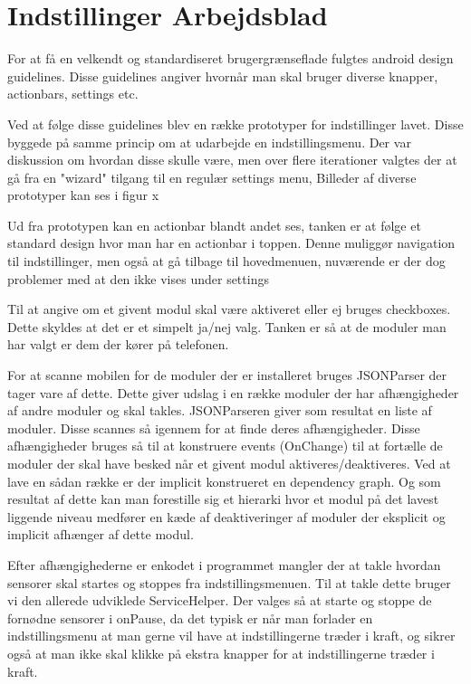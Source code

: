 \chapter{Indstillinger Arbejdsblad}
For at få en velkendt og standardiseret brugergrænseflade fulgtes android design guidelines.
Disse guidelines angiver hvornår man skal bruger diverse knapper, actionbars, settings etc.


Ved at følge disse guidelines blev en række prototyper for indstillinger lavet.
Disse byggede på samme princip om at udarbejde en indstillingsmenu.
Der var diskussion om hvordan disse skulle være, men over flere iterationer valgtes der at gå fra en "wizard" tilgang til en regulær settings menu,
Billeder af diverse prototyper kan ses i figur x 

Ud fra prototypen kan en actionbar blandt andet ses, tanken er at følge et standard design hvor man har en actionbar i toppen.
Denne muliggør navigation til indstillinger, men også at gå tilbage til hovedmenuen, nuværende er der dog problemer med at den ikke vises under settings

Til at angive om et givent modul skal være aktiveret eller ej bruges checkboxes.
Dette skyldes at det er et simpelt ja/nej valg. 
Tanken er så at de moduler man har valgt er dem der kører på telefonen.

For at scanne mobilen for de moduler der er installeret bruges JSONParser der tager vare af dette. 
Dette giver udslag i en række moduler der har afhængigheder af andre moduler og skal takles.
JSONParseren giver som resultat en liste af moduler. Disse scannes så igennem for at finde deres afhængigheder.
Disse afhængigheder bruges så til at konstruere events (OnChange) til at fortælle de moduler der skal have besked når et givent modul aktiveres/deaktiveres.
Ved at lave en sådan række er der implicit konstrueret en dependency graph.
Og som resultat af dette kan man forestille sig et hierarki hvor et modul på det lavest liggende niveau medfører en kæde af deaktiveringer af moduler der eksplicit og implicit afhænger af dette modul.

Efter afhængighederne er enkodet i programmet mangler der at takle hvordan sensorer skal startes og stoppes fra indstillingsmenuen.
Til at takle dette bruger vi den allerede udviklede ServiceHelper.
Der valges så at starte og stoppe de fornødne sensorer i onPause, da det typisk er når man forlader en indstillingsmenu at man gerne vil have at indstillingerne træder i kraft, og sikrer også at man ikke skal klikke på ekstra knapper for at indstillingerne træder i kraft.